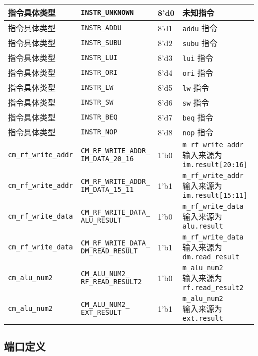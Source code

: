\documentclass[12pt,AutoFakeBold,AutoFakeSlant]{article}
\begin{document}
\begin{longtable}[]{@{}|l|l|l|l|@{}}
指令具体类型 & \texttt{INSTR\_UNKNOWN} & 8'd0 & 未知指令\tabularnewline\hline
指令具体类型 & \texttt{INSTR\_ADDU} & 8'd1 & \texttt{addu}
指令\tabularnewline\hline
指令具体类型 & \texttt{INSTR\_SUBU} & 8'd2 & \texttt{subu}
指令\tabularnewline\hline
指令具体类型 & \texttt{INSTR\_LUI} & 8'd3 & \texttt{lui}
指令\tabularnewline\hline
指令具体类型 & \texttt{INSTR\_ORI} & 8'd4 & \texttt{ori}
指令\tabularnewline\hline
指令具体类型 & \texttt{INSTR\_LW} & 8'd5 & \texttt{lw}
指令\tabularnewline\hline
指令具体类型 & \texttt{INSTR\_SW} & 8'd6 & \texttt{sw}
指令\tabularnewline\hline
指令具体类型 & \texttt{INSTR\_BEQ} & 8'd7 & \texttt{beq}
指令\tabularnewline\hline
指令具体类型 & \texttt{INSTR\_NOP} & 8'd8 & \texttt{nop}
指令\tabularnewline\hline
\texttt{cm\_rf\_write\_addr} &
\makecell{\texttt{CM\_RF\_WRITE\_ADDR\_}\\\texttt{IM\_DATA\_20\_16}} & 1'b0 &
\makecell{\texttt{m\_rf\_write\_addr} \\输入来源为 \texttt{im.result{[}20:16{]}}}\tabularnewline\hline
\texttt{cm\_rf\_write\_addr} & \makecell{\texttt{CM\_RF\_WRITE\_ADDR\_}\\\texttt{IM\_DATA\_15\_11}} & 1'b1 & \makecell{\texttt{m\_rf\_write\_addr} \\输入来源为
\texttt{im.result{[}15:11{]}}}\tabularnewline\hline
\texttt{cm\_rf\_write\_data} & \makecell{\texttt{CM\_RF\_WRITE\_DATA\_}\\\texttt{ALU\_RESULT}}
& 1'b0 & \makecell{\texttt{m\_rf\_write\_data} \\输入来源为
\texttt{alu.result}}\tabularnewline\hline
\texttt{cm\_rf\_write\_data} &
\makecell{\texttt{CM\_RF\_WRITE\_DATA\_}\\\texttt{DM\_READ\_RESULT}} & 1'b1 &
\makecell{\texttt{m\_rf\_write\_data} \\输入来源为
\texttt{dm.read\_result}}\tabularnewline\hline
\texttt{cm\_alu\_num2} & \makecell{\texttt{CM\_ALU\_NUM2\_}\\\texttt{RF\_READ\_RESULT2}} &
1'b0 & \makecell{\texttt{m\_alu\_num2} \\输入来源为
\texttt{rf.read\_result2}}\tabularnewline\hline
\texttt{cm\_alu\_num2} & \makecell{\texttt{CM\_ALU\_NUM2\_}\\\texttt{EXT\_RESULT}} & 1'b1 &
\makecell{\texttt{m\_alu\_num2} \\输入来源为 \texttt{ext.result}}\tabularnewline\hline

\end{longtable}

\hypertarget{ux7aefux53e3ux5b9aux4e49-6}{%
\subsection{端口定义}\label{ux7aefux53e3ux5b9aux4e49-6}}
\end{document}
